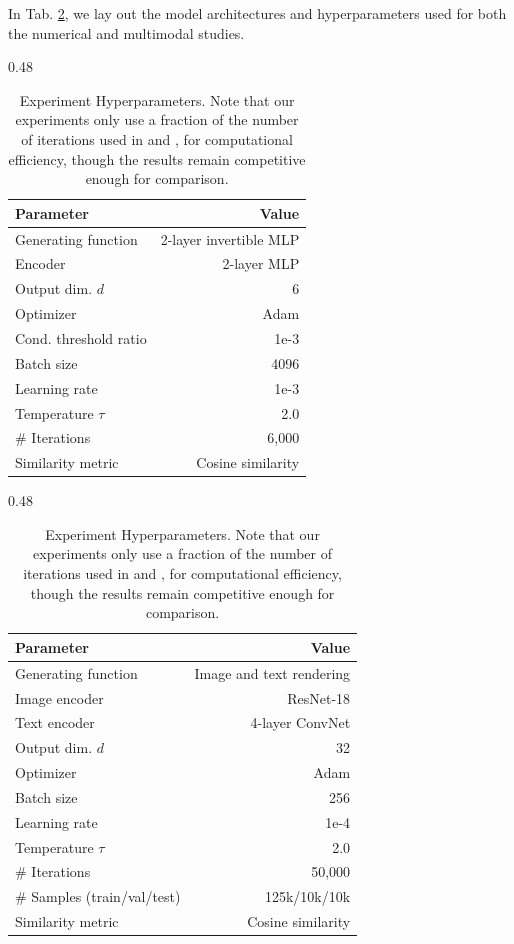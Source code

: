 \documentclass[a4paper,12pt]{article}
\begin{document}
In Tab. \ref{tab:hyperparams}, we lay out the model architectures and hyperparameters used for both the numerical and multimodal studies.
\begin{table}[ht]
  \centering
  \renewcommand{\arraystretch}{0.90}
  \begin{subtable}[t]{0.48\textwidth}
    \centering
    \small
    \begin{tabular}{@{}lr@{}}
      \toprule
      \textbf{Parameter} & \textbf{Value} \\ \midrule
      Generating function & 2-layer invertible MLP \\
      Encoder & 2-layer MLP \\
      Output dim. $d$ & 6 \\
      Optimizer & Adam \\
      Cond. threshold ratio & 1e-3 \\
      Batch size & 4096 \\
      Learning rate & 1e-3 \\
      Temperature $\tau$ & 2.0 \\
      \# Iterations & 6,000 \\
      Similarity metric & Cosine similarity \\ \bottomrule
    \end{tabular}
    \caption{Numerical simulation.}
    \label{tab:hyperparams_num}
  \end{subtable}
  \hfill
  \begin{subtable}[t]{0.48\textwidth}
    \centering
    \small
    \begin{tabular}{@{}lr@{}}
      \toprule
      \textbf{Parameter} & \textbf{Value} \\ \midrule
      Generating function & Image and text rendering \\
      Image encoder & ResNet-18 \\
      Text encoder & 4-layer ConvNet \\
      Output dim. $d$ & 32 \\
      Optimizer & Adam \\
      Batch size & 256 \\
      Learning rate & 1e-4 \\
      Temperature $\tau$ & 2.0 \\
      \# Iterations & 50,000 \\
      \# Samples (train/val/test) & 125k/10k/10k \\
      Similarity metric & Cosine similarity \\ \bottomrule
    \end{tabular}
    \caption{\textit{Multimodal3DIdent}.}
    \label{tab:hyperparams_multi}
  \end{subtable}
  \caption{Experiment Hyperparameters. Note that our experiments only use a fraction of the number of iterations used in \cite{yao2024multiviewcausalrepresentationlearning} and \cite{daunhawer2023identifiabilityresultsmultimodalcontrastive}, for computational efficiency, though the results remain competitive enough for comparison.}
  \label{tab:hyperparams}
\end{table}
\end{document}
